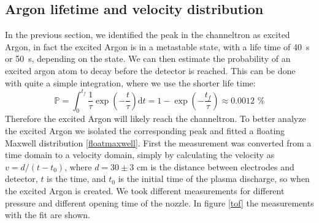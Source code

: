 \documentclass[a4paper,10pt]{article}
\begin{document}
\subsection{Argon lifetime and velocity distribution}
In the previous section, we identified the peak in the channeltron as excited Argon, in fact the excited Argon is in a metastable state, with a life time of \SI{40}{\s} or \SI{50}{\s}, depending on the state.\cite{lifetime}
We can then estimate the probability of an excited argon atom to decay before the detector is reached. This can be done with quite a simple integration, where we use the shorter life time:
\begin{equation}
	\mathbb{P} = \int_0^{t_f} \frac{1}{\tau} \exp(-\frac{t}{\tau}) \mathrm{d}t = 1 - \exp(-\frac{t_f}{\tau}) \approx 0.0012 \,\,\%
\end{equation}
Therefore the excited Argon will likely reach the channeltron. To better analyze the excited Argon we isolated the corresponding peak and fitted a floating Maxwell distribution \eqref{floatmaxwell}. First the measurement was converted from a time domain to a velocity domain, simply by calculating the velocity as $v = d/(t-t_0)$, where $d = 30\pm 3$ cm is the distance between electrodes and detector, $t$ is the time, and $t_0$ is the initial time of the plasma discharge, so when the excited Argon is created. We took different measurements for different pressure and different opening time of the nozzle. In figure \ref{tof} the measurements with the fit are shown.
\end{document}
